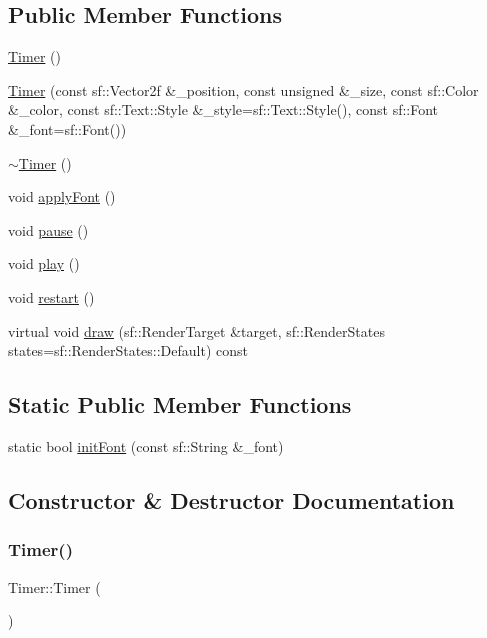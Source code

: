 \subsection*{Public Member Functions}
\begin{DoxyCompactItemize}
\item 
\hyperlink{class_timer_a5f16e8da27d2a5a5242dead46de05d97}{Timer} ()
\item 
\hyperlink{class_timer_a0a933922eec44419c94850e4e16f7121}{Timer} (const sf\+::\+Vector2f \&\+\_\+position, const unsigned \&\+\_\+size, const sf\+::\+Color \&\+\_\+color, const sf\+::\+Text\+::\+Style \&\+\_\+style=sf\+::\+Text\+::\+Style(), const sf\+::\+Font \&\+\_\+font=sf\+::\+Font())
\item 
\hyperlink{class_timer_a14fa469c4c295c5fa6e66a4ad1092146}{$\sim$\+Timer} ()
\item 
void \hyperlink{class_timer_a735fb44ab37e1fa12679d5ab291c488d}{apply\+Font} ()
\item 
void \hyperlink{class_timer_a0289effad7b573c508bc27e405900a23}{pause} ()
\item 
void \hyperlink{class_timer_a84acbe09a8dddae46c997c57a70c5076}{play} ()
\item 
void \hyperlink{class_timer_aa3f7871196bb56202af2bc982bfbfff6}{restart} ()
\item 
virtual void \hyperlink{class_timer_a80c3f4ebbd84818de5531f5af3d511de}{draw} (sf\+::\+Render\+Target \&target, sf\+::\+Render\+States states=sf\+::\+Render\+States\+::\+Default) const
\end{DoxyCompactItemize}
\subsection*{Static Public Member Functions}
\begin{DoxyCompactItemize}
\item 
static bool \hyperlink{class_timer_aac2ddf298c3916e8839e827b387e6973}{init\+Font} (const sf\+::\+String \&\+\_\+font)
\end{DoxyCompactItemize}


\subsection{Constructor \& Destructor Documentation}
\mbox{\label{class_timer_a5f16e8da27d2a5a5242dead46de05d97}} 
\subsubsection{\texorpdfstring{Timer()}{Timer()}\hspace{0.1cm}{\footnotesize\ttfamily [1/2]}}
{\footnotesize\ttfamily Timer\+::\+Timer (\begin{DoxyParamCaption}{ }\end{DoxyParamCaption})}

